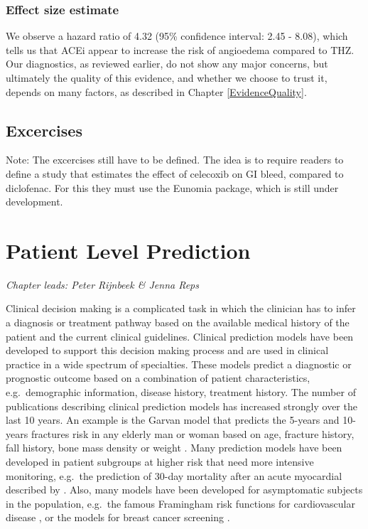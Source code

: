 \documentclass[11pt]{book}
\begin{document}
\subsection{Effect size estimate}\label{effect-size-estimate}

We observe a hazard ratio of 4.32 (95\% confidence interval: 2.45 -
8.08), which tells us that ACEi appear to increase the risk of
angioedema compared to THZ. Our diagnostics, as reviewed earlier, do not
show any major concerns, but ultimately the quality of this evidence,
and whether we choose to trust it, depends on many factors, as described
in Chapter \ref{EvidenceQuality}.

\section{Excercises}\label{excercises}

Note: The excercises still have to be defined. The idea is to require
readers to define a study that estimates the effect of celecoxib on GI
bleed, compared to diclofenac. For this they must use the Eunomia
package, which is still under development.

\chapter{Patient Level Prediction}\label{PatientLevelPrediction}

\emph{Chapter leads: Peter Rijnbeek \& Jenna Reps}

Clinical decision making is a complicated task in which the clinician
has to infer a diagnosis or treatment pathway based on the available
medical history of the patient and the current clinical guidelines.
Clinical prediction models have been developed to support this decision
making process and are used in clinical practice in a wide spectrum of
specialties. These models predict a diagnostic or prognostic outcome
based on a combination of patient characteristics, e.g.~demographic
information, disease history, treatment history. The number of
publications describing clinical prediction models has increased
strongly over the last 10 years. An example is the Garvan model that
predicts the 5-years and 10-years fractures risk in any elderly man or
woman based on age, fracture history, fall history, bone mass density or
weight \citep{nguyen2008}. Many prediction models have been developed in
patient subgroups at higher risk that need more intensive monitoring,
e.g.~the prediction of 30-day mortality after an acute myocardial
described by \citet{lee1995}. Also, many models have been developed for
asymptomatic subjects in the population, e.g.~the famous Framingham risk
functions for cardiovascular disease \citep{wilson1998}, or the models
for breast cancer screening \citep{engel2015}.
\end{document}
